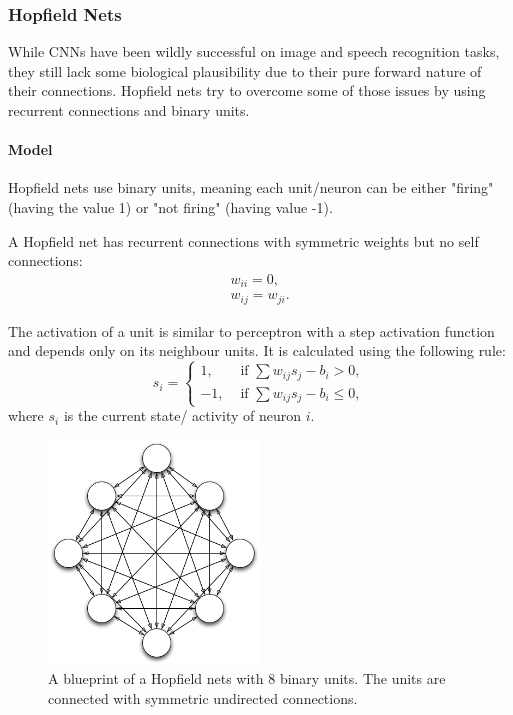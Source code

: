 \subsubsection{Hopfield Nets}

While CNNs have been wildly successful on image and speech recognition tasks, they still lack some biological plausibility due to their pure forward nature of their connections.
Hopfield nets try to overcome some of those issues by using recurrent connections and binary units.

\paragraph{Model}

Hopfield nets use binary units, meaning each unit/neuron can be either "firing" (having the value 1) or "not firing" (having value -1). 

A Hopfield net has recurrent connections with symmetric weights but no self connections:
\[
\begin{split}
w_{ii} = 0 , \\
w_{ij} = w_{ji} .
\end{split}
\]


The activation of a unit is similar to perceptron with a step activation function and depends only on its neighbour units. It is calculated using the following rule:
\[
	s_i = 
		\begin{cases}
			1, & \text{  if  } \sum w_{ij} s_{j} - b_{i}> 0 , \\
			-1, & \text{  if  } \sum w_{ij} s_{j} - b_{i} \le 0,
		\end{cases}	
\]
where $s_i$ is the current state/ activity of neuron $i$.

\begin{figure}
	\centering
    	\includegraphics[width=0.5\textwidth]{imgs/hopfield.png} 
    \caption{A blueprint of a Hopfield nets with 8 binary units. The units are connected with symmetric undirected connections.}
	\label{fig:hopfiled}
\end{figure}


